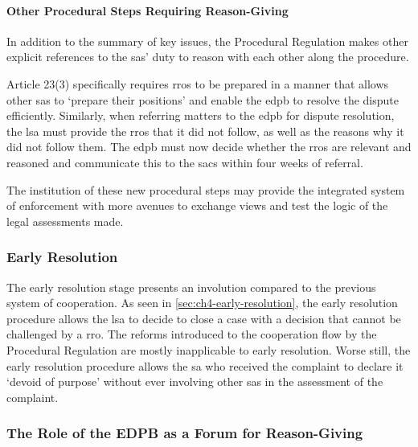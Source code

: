 \paragraph{Other Procedural Steps Requiring Reason-Giving}

In addition to the summary of key issues, the Procedural Regulation makes other explicit references to the \glspl{sa}' duty to reason with each other along the procedure.

Article 23(3) specifically requires \glspl{rro} to be prepared in a manner that allows other \glspl{sa} to `prepare their positions' and enable the \gls{edpb} to resolve the dispute efficiently.\autocite[23(3)]{ProceduralRegulation}
Similarly, when referring matters to the \gls{edpb} for dispute resolution, the \gls{lsa} must provide the \glspl{rro} that it did not follow, as well as the reasons why it did not follow them.\autocite[27(3)]{ProceduralRegulation}
The \gls{edpb} must now decide whether the \glspl{rro} are relevant and reasoned and communicate this to the \glspl{sac} within four weeks of referral.\autocite[27(5)]{ProceduralRegulation}

The institution of these new procedural steps may provide the integrated system of enforcement with more avenues to exchange views and test the logic of the legal assessments made.\autocite[1703]{liShoulderEnforcementEuropean2022}

\subsubsection{Early Resolution}
\label{sec:ch5-early-resolution}

The early resolution stage presents an involution compared to the previous system of cooperation.
As seen in \cref{sec:ch4-early-resolution}, the early resolution procedure allows the \gls{lsa} to decide to close a case with a decision that cannot be challenged by a \gls{rro}.\autocite[23(1)(c)]{ProceduralRegulation}
The reforms introduced to the cooperation flow by the Procedural Regulation are mostly inapplicable to early resolution.\autocite[5(6)]{ProceduralRegulation}
Worse still, the early resolution procedure allows the \gls{sa} who received the complaint to declare it `devoid of purpose' without ever involving other \glspl{sa} in the assessment of the complaint.\autocite[5(1)(a)]{ProceduralRegulation}

\subsubsection{The Role of the EDPB as a Forum for Reason-Giving}
\label{sec:ch5-edpb-forum}

